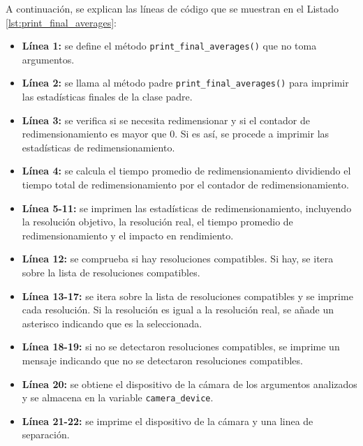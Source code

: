 A continuación, se explican las líneas de código que se muestran en el Listado \ref{lst:print_final_averages}:
\begin{itemize}
    \item \textbf{Línea 1:} se define el método \texttt{print\_final\_averages()} que no toma argumentos.
    \item \textbf{Línea 2:} se llama al método padre \texttt{print\_final\_averages()} para imprimir las estadísticas finales de la clase padre.
    \item \textbf{Línea 3:} se verifica si se necesita redimensionar y si el contador de redimensionamiento es mayor que 0. Si es así, se procede a imprimir las estadísticas de redimensionamiento.
    \item \textbf{Línea 4:} se calcula el tiempo promedio de redimensionamiento dividiendo el tiempo total de redimensionamiento por el contador de redimensionamiento.
    \item \textbf{Línea 5-11:} se imprimen las estadísticas de redimensionamiento, incluyendo la resolución objetivo, la resolución real, el tiempo promedio de redimensionamiento y el impacto en rendimiento.
    \item \textbf{Línea 12:} se comprueba si hay resoluciones compatibles. Si hay, se itera sobre la lista de resoluciones compatibles.
    \item \textbf{Línea 13-17:} se itera sobre la lista de resoluciones compatibles y se imprime cada resolución. Si la resolución es igual a la resolución real, se añade un asterisco indicando que es la seleccionada.
    \item \textbf{Línea 18-19:} si no se detectaron resoluciones compatibles, se imprime un mensaje indicando que no se detectaron resoluciones compatibles.
    \item \textbf{Línea 20:} se obtiene el dispositivo de la cámara de los argumentos analizados y se almacena en la variable \texttt{camera\_device}.
    \item \textbf{Línea 21-22:} se imprime el dispositivo de la cámara y una linea de separación.
\end{itemize}

